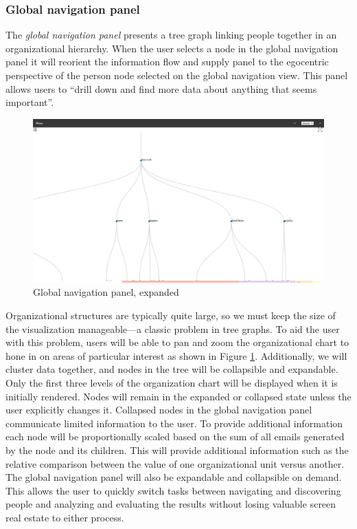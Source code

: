 \documentclass[12pt,letterpaper]{article}
\begin{document}
\subsubsection{Global navigation panel}




The \emph{global navigation panel} presents a tree graph linking people together in an organizational hierarchy. When the user selects a node in the global navigation panel it will reorient the information flow and supply panel to the egocentric perspective of the person node selected on the global navigation view. This panel allows users to “drill down and find more data about anything that seems important”\cite{ware2012information}.
\begin{figure}
  \centering
  \includegraphics[width=\columnwidth]{pics/expanded_app.jpg}
  \caption{Global navigation panel, expanded}
  \label{fig:global}
\end{figure}
Organizational structures are typically quite large, so we must keep the size of the visualization manageable---a classic problem in tree graphs\cite{herman2000graph}.  To aid the user with this problem, users will be able to pan and zoom the organizational chart to hone in on areas of particular interest as shown in Figure \ref{fig:global}.  Additionally, we will cluster data together, and nodes in the tree will be collapsible and expandable. Only the first three levels of the organization chart will be displayed when it is initially rendered.  Nodes will remain in the expanded or collapsed state unless the user explicitly changes it.  Collapsed nodes in the global navigation panel communicate limited information to the user.  To provide additional information each node will be proportionally scaled based on the sum of all emails generated by the node and its children.  This will provide additional information such as the relative comparison between the value of one organizational unit versus another.  The global navigation panel will also be expandable and collapsible on demand.  This allows the user to quickly switch tasks between navigating and discovering people and analyzing and evaluating the results without losing valuable screen real estate to either process.
\end{document}
